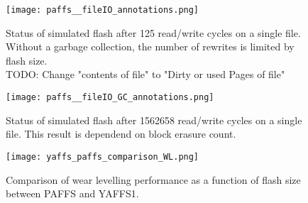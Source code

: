 \begin{figure}[htp]
	\centering\texttt{[image: paffs\_\_fileIO\_annotations.png]}
	\caption{\label{fig:fileIO} Status of simulated flash after 125 read/write cycles on a single file. Without a garbage collection, the number of rewrites is limited by flash size.\\TODO: Change "contents of file" to "Dirty or used Pages of file"}
\end{figure}
\begin{figure}[htp]
	\centering\texttt{[image: paffs\_\_fileIO\_GC\_annotations.png]}
	\caption{\label{fig:GC} Status of simulated flash after 1562658 read/write cycles on a single file. This result is dependend on block erasure count.}
\end{figure}
\begin{figure}[htp]
	\centering\texttt{[image: yaffs\_paffs\_comparison\_WL.png]}
	\caption{\label{fig:fileIOCompare} Comparison of wear levelling performance as a function of flash size between PAFFS and YAFFS1.}
\end{figure}
